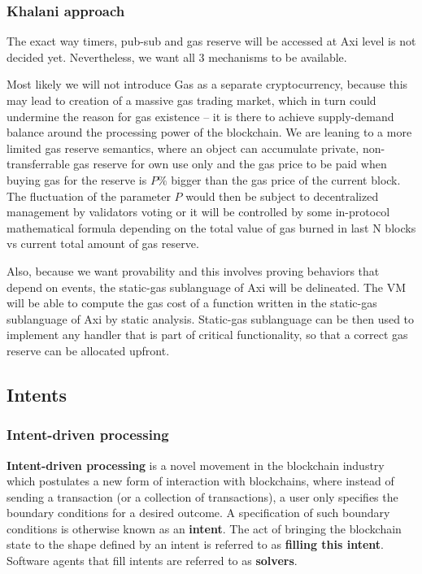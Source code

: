\documentclass[a4paper]{article}
\begin{document}
\subsubsection{Khalani approach}

The exact way timers, pub-sub and gas reserve will be accessed at Axi level is not decided yet. Nevertheless, we want all 3 mechanisms to be available.

Most likely we will not introduce Gas as a separate cryptocurrency, because this may lead to creation of a massive gas trading market, which in turn could undermine the reason for gas existence -- it is there to achieve supply-demand balance around the processing power of the blockchain. We are leaning to a more limited gas reserve semantics, where an object can accumulate private, non-transferrable gas reserve for own use only and the gas price to be paid when buying gas for the reserve is \(P\%\) bigger than the gas price of the current block. The fluctuation of the parameter \(P\) would then be subject to decentralized management by validators voting or it will be controlled by some in-protocol mathematical formula depending on the total value of gas burned in last N blocks vs current total amount of gas reserve.

Also, because we want provability and this involves proving behaviors that depend on events, the static-gas sublanguage of Axi will be delineated. The VM will be able to compute the gas cost of a function written in the static-gas sublanguage of Axi by static analysis. Static-gas sublanguage can be then used to implement any handler that is part of critical functionality, so that a correct gas reserve can be allocated upfront.

\subsection{Intents}

\subsubsection{Intent-driven processing}

\textbf{Intent-driven processing} is a novel movement in the blockchain industry which postulates a new form of interaction with blockchains, where instead of sending a transaction (or a collection of transactions), a user only specifies the boundary conditions for a desired outcome. A specification of such boundary conditions is otherwise known as an \textbf{intent}. The act of bringing the blockchain state to the shape defined by an intent is referred to as \textbf{filling this intent}. Software agents that fill intents are referred to as \textbf{solvers}.
\end{document}
